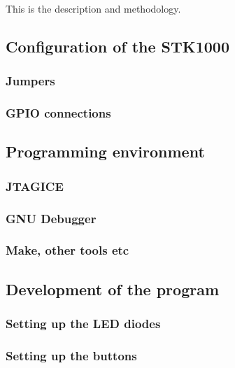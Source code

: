 This is the description and methodology.

\subsection{Configuration of the STK1000}

\subsubsection{Jumpers}



\subsubsection{GPIO connections}



\subsection{Programming environment}

\subsubsection{JTAGICE}



\subsubsection{GNU Debugger}

\subsubsection{Make, other tools etc}

\subsection{Development of the program}

\subsubsection{Setting up the LED diodes}

\subsubsection{Setting up the buttons}

